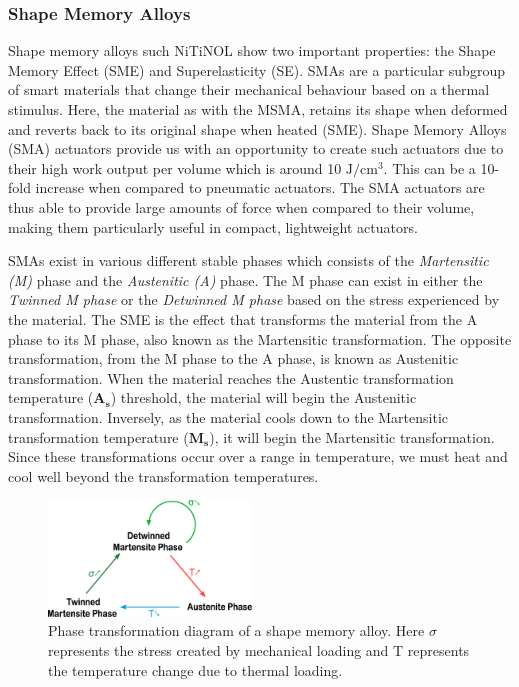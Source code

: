 \subsubsection{Shape Memory Alloys}
Shape memory alloys such NiTiNOL show two important properties: the Shape Memory Effect (SME) and Superelasticity (SE)\cite{rao_design_2015}. SMAs are a particular subgroup of smart materials that change their mechanical behaviour based on a thermal stimulus. Here, the material as with the MSMA, retains its shape when deformed and reverts back to its original shape when heated (SME). Shape Memory Alloys (SMA) actuators provide us with an opportunity to create such actuators due to their high work output per volume which is around 10 $\mathrm{J}/\mathrm{cm}^3$\cite{mohd_jani_review_2014}. This can be a 10-fold increase when compared to pneumatic actuators. The SMA actuators are thus able to provide large amounts of force when compared to their volume, making them particularly useful in compact, lightweight actuators.

SMAs exist in various different stable phases which consists of the \emph{Martensitic (M)} phase and the \emph{Austenitic (A)} phase. The M phase can exist in either the \emph{Twinned M phase} or the \emph{Detwinned M phase} based on the stress experienced by the material. The SME is the effect that transforms the material from the A phase to its M phase, also known as the Martensitic transformation. The opposite transformation, from the M phase to the A phase, is known as Austenitic transformation. When the material reaches the Austentic transformation temperature ($\mathbf{A_s}$) threshold, the material will begin the Austenitic transformation. Inversely, as the material cools down to the Martensitic transformation temperature ($\mathbf{M_s}$), it will begin the Martensitic transformation. Since these transformations occur over a range in temperature, we must heat and cool well beyond the transformation temperatures.

\begin{figure}
  \centering
  \includegraphics[width=0.48\textwidth]{Figures/Phase_Transf_Diagram_noText.eps}
  \caption{Phase transformation diagram of a shape memory alloy. Here $\sigma$ represents the stress created by mechanical loading and T represents the temperature change due to thermal loading.}
	\vspace{-10pt}
  \label{fig:PhaseTransfDiagram}
\end{figure}


